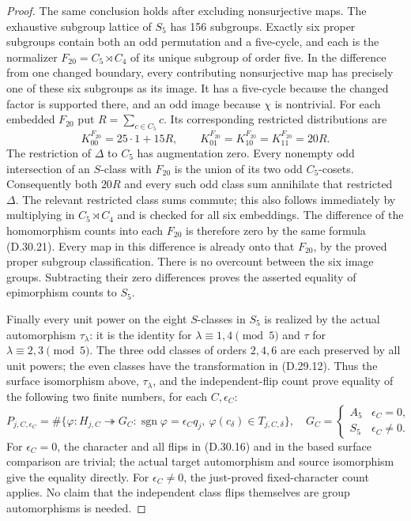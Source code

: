 \begin{proof}
The same conclusion holds after excluding
nonsurjective maps.  The exhaustive subgroup
lattice of $S_5$ has 156 subgroups.  Exactly
six proper subgroups contain both an odd
permutation and a five-cycle, and each is
the normalizer $F_{20}=C_5\rtimes C_4$ of
its unique subgroup of order five.
In the difference from one changed boundary,
every contributing nonsurjective map has
precisely one of these six subgroups as its
image.  It has a five-cycle because the changed
factor is supported there, and an odd image
because $\chi$ is nontrivial.
For each embedded $F_{20}$ put $R=\sum_{c\in C_5}c$.
Its corresponding restricted distributions are
\[
 K^{F_{20}}_{00}=25\cdot1+15R,
 \qquad
 K^{F_{20}}_{01}=K^{F_{20}}_{10}
                   =K^{F_{20}}_{11}=20R.
 \tag{D.30.22}
\]
The restriction of $\Delta$ to $C_5$ has
augmentation zero.  Every nonempty odd
intersection of an $S$-class with $F_{20}$
is the union of its two odd $C_5$-cosets.
Consequently both $20R$ and every such odd
class sum annihilate that restricted
$\Delta$.  The relevant restricted class
sums commute; this also follows immediately
by multiplying in $C_5\rtimes C_4$ and is
checked for all six embeddings.
The difference of the homomorphism counts
into each $F_{20}$ is therefore zero by the
same formula \textup{(D.30.21)}.
Every map in this difference is already
onto that $F_{20}$, by the proved proper
subgroup classification.  There is no
overcount between the six image groups.
Subtracting their zero differences proves
the asserted equality of epimorphism counts
to $S_5$.

Finally every unit power on the eight
$S$-classes in $S_5$ is realized by the
actual automorphism $\tau_\lambda$: it is
the identity for $\lambda\equiv1,4\pmod5$
and $\tau$ for $\lambda\equiv2,3\pmod5$.
The three odd classes of orders $2,4,6$
are each preserved by all unit powers;
the even classes have the transformation
in \textup{(D.29.12)}.
Thus the surface isomorphism above,
$\tau_\lambda$, and the independent-flip
count prove equality of the following
two finite numbers, for each $C,\epsilon_C$:
\[
 P_{j,C,\epsilon_C}
 =\#\{\varphi:H_{j,C}\twoheadrightarrow G_C:
       \operatorname{sgn}\varphi=\epsilon_Cq_j,
       \ \varphi(c_\delta)\in T_{j,C,\delta}\},
 \quad
 G_C=\begin{cases}A_5&\epsilon_C=0,\\S_5&\epsilon_C\ne0.
       \end{cases}
 \tag{D.30.23}
\]
For $\epsilon_C=0$, the character and all
flips in \textup{(D.30.16)} and in the
based surface comparison are trivial;
the actual target automorphism and source
isomorphism give the equality directly.
For $\epsilon_C\ne0$, the just-proved
fixed-character count applies.  No claim
that the independent class flips themselves
are group automorphisms is needed.


\end{proof}
